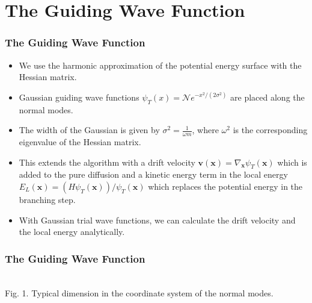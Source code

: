 \documentclass[16pt]{beamer}
\begin{document}
\section{The Guiding Wave Function}
\begin{frame}
\frametitle{The Guiding Wave Function}
\begin{itemize}
\item We use the harmonic approximation of the potential energy surface with the Hessian matrix.
\item Gaussian guiding wave functions $\psi_T(x) = \mathcal{N} e^{-x^2/(2 \sigma^2)}$ are placed along the normal modes.
\item The width of the Gaussian is given by $\sigma^2 = \frac{1}{\omega m}$, where $\omega^2$ is the corresponding eigenvalue of the Hessian matrix.
\item This extends the algorithm with a drift velocity $\bm{v}(\bm{x}) = \nabla_{\bm{x}} \psi_T(\bm{x})$ which is added to the pure diffusion and a kinetic energy term in the local energy $E_L(\bm{x}) = (H\psi_T(\bm{x}))/\psi_T(\bm{x})$ which replaces the potential energy in the branching step.
\item With Gaussian trial wave functions, we can calculate the drift velocity and the local energy analytically.

\end{itemize} 

\end{frame}

\begin{frame}
\frametitle{The Guiding Wave Function}
\begin{center}
\\
Fig. 1. Typical dimension in the coordinate system of the normal modes.
\end{center}

\end{frame}
\end{document}
